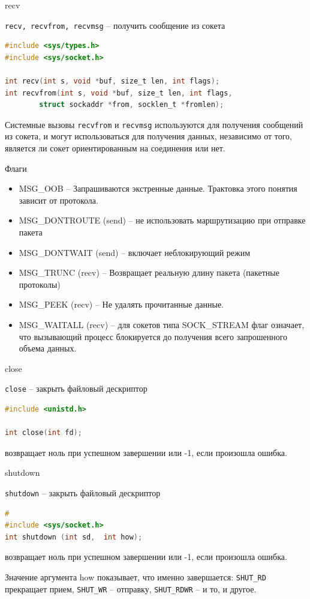 \begin{frame}[fragile]{recv}

{\tt recv,  recvfrom,  recvmsg} -- получить сообщение из сокета
\begin{lstlisting}[language=C]
#include <sys/types.h>
#include <sys/socket.h>

int recv(int s, void *buf, size_t len, int flags);
int recvfrom(int s, void *buf, size_t len, int flags,
		struct sockaddr *from, socklen_t *fromlen);
\end{lstlisting}
Системные вызовы {\tt recvfrom} и {\tt recvmsg} используются для получения сообщений из  сокета, и  могут
использоваться  для получения данных,  независимо от того,  является ли сокет ориентированным на
соединения или нет.
\end{frame}

\begin{frame}{Флаги}
	\begin{itemize}
	\item MSG\_OOB -- Запрашиваются экстренные данные. Трактовка этого понятия зависит от протокола.
	\item MSG\_DONTROUTE (send) -- не использовать  маршрутизацию  при  отправке пакета
	\item MSG\_DONTWAIT (send) -- включает неблокирующий режим
	\item MSG\_TRUNC (recv) -- Возвращает реальную длину пакета (пакетные протоколы) 
	\item MSG\_PEEK (recv) -- Не удалять прочитанные данные.
	\item MSG\_WAITALL (recv) -- для сокетов типа SOCK\_STREAM флаг означает,  что вызывающий процесс блокируется до получения всего запрошенного объема данных.
	\end{itemize}
\end{frame}

\begin{frame}[fragile]{close}

{\tt close} -- закрыть файловый дескриптор
\begin{lstlisting}[language=C]
#include <unistd.h>

int close(int fd);
\end{lstlisting}
возвращает ноль при успешном завершении или -1,  если произошла ошибка.
\end{frame}

\begin{frame}[fragile]{shutdown}

{\tt shutdown} -- закрыть файловый дескриптор
\begin{lstlisting}[language=C]
#
#include <sys/socket.h>
int shutdown (int sd,  int how);
\end{lstlisting}
возвращает ноль при успешном завершении или -1,  если произошла ошибка.

Значение аргумента how показывает,  что именно завершается: {\tt SHUT\_RD} прекращает прием, {\tt SHUT\_WR} -- отправку, {\tt SHUT\_RDWR} -- и то, и другое.
\end{frame}

